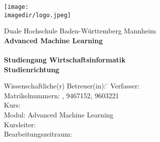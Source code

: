 \begin{titlepage}
\begin{minipage}{\textwidth}
		\vspace{-2cm}
    \begin{center}
        \texttt{[image: \\imagedir/logo.jpeg]}
    \end{center}
\end{minipage}
\vspace{1em}
\begin{center}
	{\textsf{\large Duale Hochschule Baden-W\"urttemberg Mannheim}}\\[4em]
	{\textsf{\textbf{Advanced Machine Learning}}}\\[6mm]
	{\textsf{\textbf{\Large{}\DerTitelDerArbeit}}} \\[1.5cm]
	{\textsf{\textbf{\large{}Studiengang Wirtschaftsinformatik}}\\[6mm]
	\textsf{\textbf{Studienrichtung \DieStudienrichtung}}}\vspace{10em}
	
	\begin{minipage}{\textwidth}
		\begin{tabbing}
		Wissenschaftliche(r) Betreuer(in): \hspace{0.25cm}\=\kill
		Verfasser: \> \DerAutorDerArbeit \\[1.5mm]
		Matrikelnummern: , 9467152, 9603221 \\[1.5mm]
		Kurs: \> \DieKursbezeichnung \\[1.5mm]
		Modul: \> Advanced Machine Learning \\[1.5mm]
		Kursleiter: \> \DerStudiengangsleiter \\[1.5mm]
		Bearbeitungszeitraum: \> \DerBearbeitungszeitraum\\[1.5mm]
		\end{tabbing}
	\end{minipage}
\end{center}
\end{titlepage}